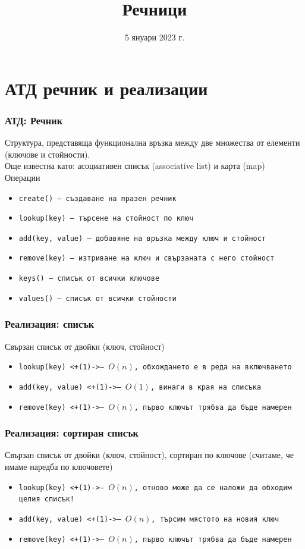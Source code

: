 \documentclass[alsotrans]{beamerswitch}
\title{Речници}
\date{5 януари 2023 г.}
\begin{document}
\begin{frame}
  \titlepage
\end{frame}

\section{АТД речник и реализации}

\begin{frame}
  \frametitle{АТД: Речник}
  Структура, представяща функционална връзка между две множества от елементи (ключове и стойности).\\[2ex]
  \pause
  Още известна като: асоциативен списък (associative list) и карта (map)\\[2ex]
  \pause
  Операции
  \begin{itemize}
  \item \tt{create()} --- създаване на празен речник
  \item \tt{lookup(key)} --- търсене на стойност по ключ
  \item \tt{add(key, value)} --- добавяне на връзка между ключ и стойност
  \item \tt{remove(key)} --- изтриване на ключ и свързаната с него стойност
  \item \tt{keys()} --- списък от всички ключове
  \item \tt{values()} --- списък от всички стойности
  \end{itemize}
\end{frame}

\begin{frame}
  \frametitle{Реализация: списък}
  Свързан списък от двойки (ключ, стойност)
  \pause
  \begin{itemize}
  \item \tt{lookup(key)} \onslide<+(1)->{--- $O(n)$, обхождането е в реда на включването}
  \item \tt{add(key, value)} \onslide<+(1)->{--- $O(1)$, винаги в края на списъка}
  \item \tt{remove(key)} \onslide<+(1)->{--- $O(n)$, първо ключът трябва да бъде намерен}
  \end{itemize}
\end{frame}

\begin{frame}
  \frametitle{Реализация: сортиран списък}
  Свързан списък от двойки (ключ, стойност), сортиран по ключове (считаме, че имаме наредба по ключовете)
  \pause
  \begin{itemize}
  \item \tt{lookup(key)} \onslide<+(1)->{--- $O(n)$, отново може да се наложи да обходим целия списък!}
  \item \tt{add(key, value)} \onslide<+(1)->{--- \alert{$O(n)$}, търсим мястото на новия ключ}
  \item \tt{remove(key)} \onslide<+(1)->{--- $O(n)$, първо ключът трябва да бъде намерен}
  \end{itemize}
\end{frame}
\end{document}
